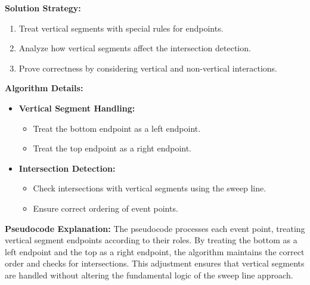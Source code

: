 \begin{center}
\end{center}

\textbf{Solution Strategy:}
\begin{enumerate}[noitemsep]
    \item Treat vertical segments with special rules for endpoints.
    \item Analyze how vertical segments affect the intersection detection.
    \item Prove correctness by considering vertical and non-vertical interactions.
\end{enumerate}

\textbf{Algorithm Details:}
\begin{itemize}[noitemsep]
    \item \textbf{Vertical Segment Handling:}
        \begin{itemize}[noitemsep]
            \item Treat the bottom endpoint as a left endpoint.
            \item Treat the top endpoint as a right endpoint.
        \end{itemize}
    \item \textbf{Intersection Detection:}
        \begin{itemize}[noitemsep]
            \item Check intersections with vertical segments using the sweep line.
            \item Ensure correct ordering of event points.
        \end{itemize}
\end{itemize}

\textbf{Pseudocode Explanation:}
The pseudocode processes each event point, treating vertical segment endpoints according to their roles. By treating the bottom as a left endpoint and the top as a right endpoint, the algorithm maintains the correct order and checks for intersections. This adjustment ensures that vertical segments are handled without altering the fundamental logic of the sweep line approach.

